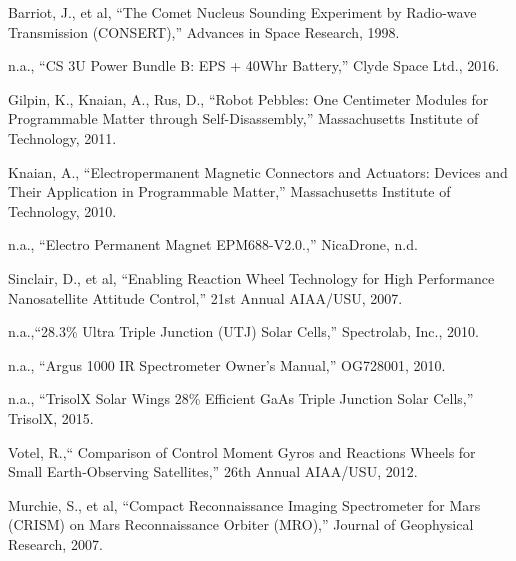 \documentclass[nocover]            %
{CSLI}                       %
\begin{document}
\begin{thebibliography}{}

 Barriot, J., et al, ``The Comet Nucleus Sounding Experiment by Radio-wave Transmission (CONSERT),'' Advances in Space Research, 1998.

 n.a., ``CS 3U Power Bundle B: EPS + 40Whr Battery,'' Clyde Space Ltd., 2016.

 Gilpin, K., Knaian, A., Rus, D., ``Robot Pebbles: One Centimeter Modules for Programmable Matter through Self-Disassembly,'' Massachusetts Institute of Technology, 2011.

 Knaian, A., ``Electropermanent Magnetic Connectors and Actuators: Devices and Their Application in Programmable Matter,'' Massachusetts Institute of Technology, 2010.

 n.a., ``Electro Permanent Magnet EPM688-V2.0.,'' NicaDrone, n.d.

 Sinclair, D., et al, ``Enabling Reaction Wheel Technology for High Performance Nanosatellite Attitude Control,'' 21st Annual AIAA/USU, 2007.

 n.a.,``28.3\% Ultra Triple Junction (UTJ) Solar Cells,'' Spectrolab, Inc., 2010.

 n.a., ``Argus 1000 IR Spectrometer Owner's Manual,'' OG728001, 2010.

 n.a., ``TrisolX Solar Wings 28\% Efficient GaAs Triple Junction Solar Cells,'' TrisolX, 2015.

 Votel, R.,`` Comparison of Control Moment Gyros and Reactions Wheels for Small Earth-Observing Satellites,'' 26th Annual AIAA/USU, 2012.


 Murchie, S., et al, ``Compact Reconnaissance Imaging Spectrometer for Mars (CRISM) on Mars Reconnaissance Orbiter (MRO),'' Journal of Geophysical Research,  2007.

\end{thebibliography}
\end{document}
